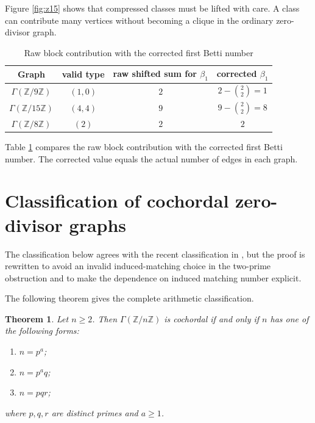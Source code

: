 \documentclass[12pt]{article}
\newtheorem{theorem}{Theorem}[section]
\theoremstyle{definition}
\begin{document}
\medskip

Figure \ref{fig:z15} shows that compressed classes must be lifted with care.  A class can contribute many vertices without becoming a clique in the ordinary zero-divisor graph.

\medskip

\begin{table}[H]
	\begin{center}
\begin{tabular}{cccc}
\toprule
Graph & valid type & raw shifted sum for $\beta_1$ & corrected $\beta_1$\\
\midrule
$\Gamma(\mathbb{Z}/9\mathbb{Z})$ & $(1,0)$ & $2$ & $2-\binom{2}{2}=1$\\[2mm]
$\Gamma(\mathbb{Z}/15\mathbb{Z})$ & $(4,4)$ & $9$ & $9-\binom{2}{2}=8$\\
$\Gamma(\mathbb{Z}/8\mathbb{Z})$ & $(2)$ & $2$ & $2$\\
\bottomrule
\end{tabular}
\end{center}
\label{tab 1}
\caption{Raw block contribution with the corrected first Betti number}
\end{table}
\medskip

Table \ref{tab 1} compares the raw block contribution with the corrected first Betti number.  The corrected value equals the actual number of edges in each graph.



\section{Classification of cochordal zero-divisor graphs}\label{sec:classification}

The classification below agrees with the recent classification in \cite{DungVu2026}, but the proof is rewritten to avoid an invalid induced-matching choice in the two-prime obstruction and to make the dependence on induced matching number explicit.

\medskip

\noindent The following theorem gives the complete arithmetic classification.
\begin{theorem}\label{thm:classification}
Let $n\geq 2$.  Then $\Gamma(\mathbb{Z}/n\mathbb{Z})$ is cochordal if and only if $n$ has one of the following forms:
\begin{enumerate}[label=\textup{(\roman*)}]
\item $n=p^a$;
\item $n=p^a q$;
\item $n=pqr$;
\end{enumerate}
where $p,q,r$ are distinct primes and $a\geq 1$.
\end{theorem}
\end{document}
